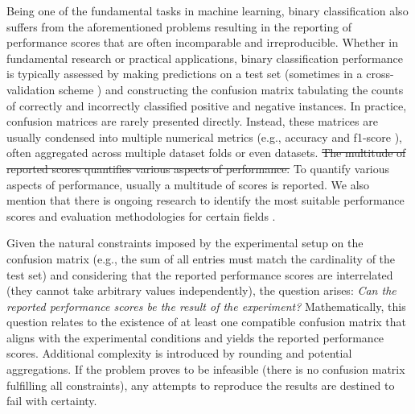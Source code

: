 \documentclass[3p, times]{elsarticle}
\begin{document}
Being one of the fundamental tasks in machine learning, binary classification \cite{mlbook} also suffers from the aforementioned problems resulting in the reporting of performance scores that are often incomparable and irreproducible. Whether in fundamental research or practical applications, binary classification performance is typically assessed by making predictions on a test set (sometimes in a cross-validation scheme \cite{cv1}) and constructing the confusion matrix \cite{scores} tabulating the counts of correctly and incorrectly classified positive and negative instances. In practice, confusion matrices are rarely presented directly. Instead, these matrices are usually condensed into multiple numerical metrics (e.g., accuracy and f1-score \cite{scores}), often aggregated across multiple dataset folds or even datasets. 
{\color{red}\st{The multitude of reported scores quantifies various aspects of performance.}}
{\color{blue} To quantify various aspects of performance, usually a multitude of scores is reported. We also mention that there is ongoing research to identify the most suitable performance scores and evaluation methodologies for certain fields \cite{mccbetter, add1, add0}.}

Given the natural constraints imposed by the experimental setup on the confusion matrix (e.g., the sum of all entries must match the cardinality of the test set) and considering that the reported performance scores are interrelated (they cannot take arbitrary values independently), the question arises: \emph{Can the reported performance scores be the result of the experiment?} Mathematically, this question relates to the existence of at least one compatible confusion matrix that aligns with the experimental conditions and yields the reported performance scores. Additional complexity is introduced by rounding and potential aggregations. If the problem proves to be infeasible (there is no confusion matrix fulfilling all constraints), any attempts to reproduce the results are destined to fail with certainty. 
\end{document}
